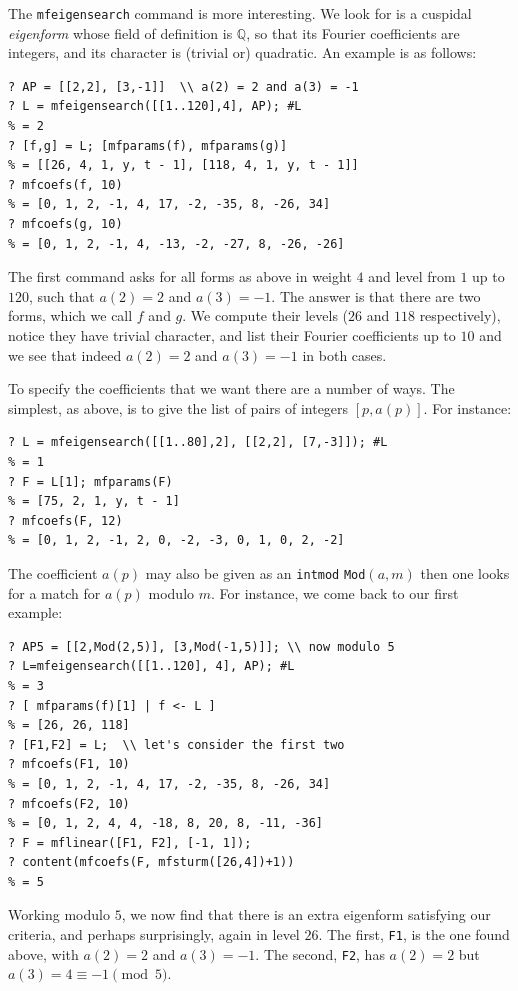 \documentclass[11pt]{article}
\newcommand{\Q}{{\mathbb Q}}
\def\kbd#1{{\tt #1}}
\begin{document}
The \kbd{mfeigensearch} command is more interesting. We look for is a
cuspidal \emph{eigenform} whose field of definition is $\Q$, so that its
Fourier coefficients are integers, and its character is (trivial or)
quadratic. An example is as follows:
\begin{verbatim}
? AP = [[2,2], [3,-1]]  \\ a(2) = 2 and a(3) = -1
? L = mfeigensearch([[1..120],4], AP); #L
% = 2
? [f,g] = L; [mfparams(f), mfparams(g)]
% = [[26, 4, 1, y, t - 1], [118, 4, 1, y, t - 1]]
? mfcoefs(f, 10)
% = [0, 1, 2, -1, 4, 17, -2, -35, 8, -26, 34]
? mfcoefs(g, 10)
% = [0, 1, 2, -1, 4, -13, -2, -27, 8, -26, -26]
\end{verbatim}

The first command asks for all forms as above in weight $4$ and level from
$1$ up to $120$, such that $a(2)=2$ and $a(3)=-1$. The answer is that there
are two forms, which we call $f$ and $g$. We compute their levels ($26$ and
$118$ respectively), notice they have trivial character, and list their
Fourier coefficients up to $10$ and we see that indeed $a(2)=2$ and $a(3)=-1$
in both cases.

To specify the coefficients that we want there are a number of ways. The
simplest, as above, is to give the list of pairs of integers $[p,a(p)]$.
For instance:
\begin{verbatim}
? L = mfeigensearch([[1..80],2], [[2,2], [7,-3]]); #L
% = 1
? F = L[1]; mfparams(F)
% = [75, 2, 1, y, t - 1]
? mfcoefs(F, 12)
% = [0, 1, 2, -1, 2, 0, -2, -3, 0, 1, 0, 2, -2]
\end{verbatim}

The coefficient $a(p)$ may also be given as an \kbd{intmod} \kbd{Mod}$(a,m)$
then one looks for a match for $a(p)$ modulo $m$. For instance, we come
back to our first example:
\begin{verbatim}
? AP5 = [[2,Mod(2,5)], [3,Mod(-1,5)]]; \\ now modulo 5
? L=mfeigensearch([[1..120], 4], AP); #L
% = 3
? [ mfparams(f)[1] | f <- L ]
% = [26, 26, 118]
? [F1,F2] = L;  \\ let's consider the first two
? mfcoefs(F1, 10)
% = [0, 1, 2, -1, 4, 17, -2, -35, 8, -26, 34]
? mfcoefs(F2, 10)
% = [0, 1, 2, 4, 4, -18, 8, 20, 8, -11, -36]
? F = mflinear([F1, F2], [-1, 1]);
? content(mfcoefs(F, mfsturm([26,4])+1))
% = 5
\end{verbatim}
Working modulo $5$, we now find that there is an extra eigenform satisfying
our criteria, and perhaps surprisingly, again in level $26$. The first,
\kbd{F1}, is the one found above, with $a(2)=2$ and $a(3)=-1$. The second,
\kbd{F2}, has $a(2)=2$ but $a(3)=4\equiv-1\pmod5$.
\end{document}
